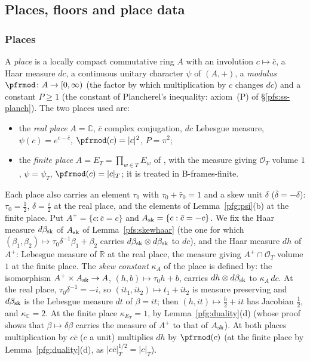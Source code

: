 \documentclass[10pt]{amsart}
\theoremstyle{definition}
\theoremstyle{remark}
\newcommand{\C}{\mathbb C}
\newcommand{\R}{\mathbb R}
\providecommand{\auO}{\mathcal O}
\begin{document}
\subsection{Places, floors and place data}\label{pfr:ss-setting}

\subsubsection*{Places}
A \emph{place} is a locally compact commutative ring $A$ with an involution $c\mapsto\bar c$, a Haar
measure $dc$, a continuous unitary character $\psi$ of $(A,+)$, a \emph{modulus}
$\pfrmod\colon A\to[0,\infty)$ (the factor by which multiplication by $c$ changes $dc$) and a
constant $P\ge1$ (the constant of Plancherel's inequality: axiom~(P) of \S\ref{pfs:ss-planch}). The two places used
are:
\begin{itemize}
\item the \emph{real place} $A=\C$, $\bar c$ complex conjugation, $dc$ Lebesgue measure,
$\psi(c)=e^{c-\bar c}$, $\pfrmod(c)=|c|^2$, $P=\pi^2$;
\item the \emph{finite place} $A=E_T=\prod_{w\in T}E_w$ of {\cite[\S3.3.3]{P51}}, with the measure
giving $\auO_T$ volume $1$, $\psi=\psi_T$, $\pfrmod(c)=|c|_T$; it is treated in
\textup{B-frames-finite}.
\end{itemize}
Each place also carries an element $\tau_0$ with $\tau_0+\bar\tau_0=1$ and a skew unit $\delta$
($\bar\delta=-\delta$): $\tau_0=\frac12$, $\delta=\frac i2$ at the real place, and the elements of
Lemma~\ref{pfg:psi}(b) at the finite place. Put $A^+=\{c:\bar c=c\}$ and $A_{\rm sk}=\{c:\bar c=-c\}$. We fix
the Haar measure $d\beta_{\rm sk}$ of $A_{\rm sk}$ of Lemma~\ref{pfs:skewhaar} (the one for which
$(\beta_1,\beta_2)\mapsto\tau_0\delta^{-1}\beta_1+\beta_2$ carries $d\beta_{\rm sk}\otimes d\beta_{\rm sk}$ to $dc$), and the
Haar measure $dh$ of $A^+$: Lebesgue measure of $\R$ at the real place, the measure giving $A^+\cap\auO_T$ volume $1$
at the finite place. The \emph{skew constant} $\kappa_A$ of the place is defined by: the isomorphism
$A^+\times A_{\rm sk}\to A$, $(h,b)\mapsto\tau_0h+b$, carries $dh\otimes d\beta_{\rm sk}$ to $\kappa_A\,dc$. At the
real place, $\tau_0\delta^{-1}=-i$, so $(it_1,it_2)\mapsto t_1+it_2$ is measure preserving and $d\beta_{\rm sk}$ is the
Lebesgue measure $dt$ of $\beta=it$; then $(h,it)\mapsto\frac h2+it$ has Jacobian $\frac12$, and $\kappa_\C=2$. At the
finite place $\kappa_{E_T}=1$, by Lemma~\ref{pfg:duality}(d) (whose proof shows that $\beta\mapsto\delta\beta$ carries
the measure of $A^+$ to that of $A_{\rm sk}$). At both places multiplication by $c\bar c$ ($c$ a unit) multiplies $dh$
by $\pfrmod(c)$ (at the finite place by Lemma~\ref{pfg:duality}(d), as $|c\bar c|_T^{1/2}=|c|_T$).
\end{document}
